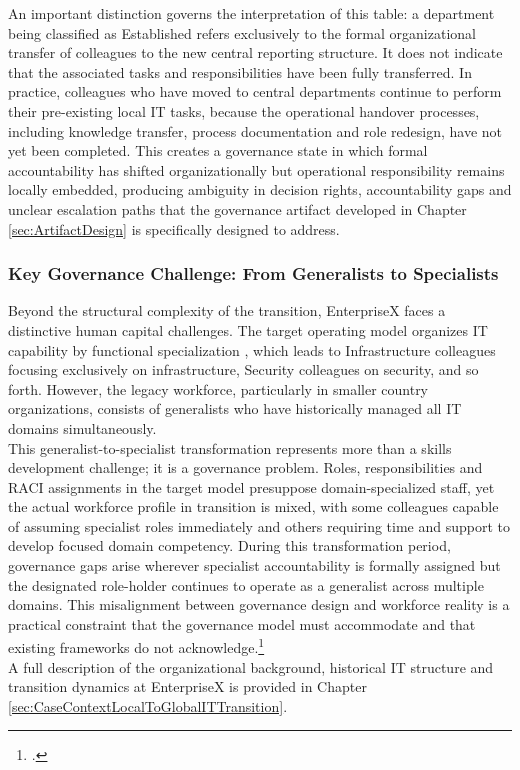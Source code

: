 An important distinction governs the interpretation of this table: a department being classified as \glqq{}Established\grqq{} refers exclusively to the formal organizational transfer of colleagues to the new central reporting structure.
It does not indicate that the associated tasks and responsibilities have been fully transferred.
In practice, colleagues who have moved to central departments continue to perform their pre-existing local IT tasks, because the operational handover processes, including knowledge transfer, process documentation and role redesign, have not yet been completed.
This creates a governance state in which formal accountability has shifted organizationally but operational responsibility remains locally embedded, producing ambiguity in decision rights, accountability gaps and unclear escalation paths that the governance artifact developed in Chapter \ref{sec:ArtifactDesign} is specifically designed to address.

\subsubsection{Key Governance Challenge: From Generalists to Specialists}
\label{subsubsec:GeneralistToSpecialistChallenge}
Beyond the structural complexity of the transition, EnterpriseX faces a distinctive human capital challenges.
The target operating model organizes IT capability by functional specialization , which leads to Infrastructure colleagues focusing exclusively on infrastructure, Security colleagues on security, and so forth.
However, the legacy workforce, particularly in smaller country organizations, consists of generalists who have historically managed all IT domains simultaneously.
\\
This generalist-to-specialist transformation represents more than a skills development challenge; it is a governance problem.
Roles, responsibilities and \ac{RACI} assignments in the target model presuppose domain-specialized staff, yet the actual workforce profile in transition is mixed, with some colleagues capable of assuming specialist roles immediately and others requiring time and support to develop focused domain competency.
During this transformation period, governance gaps arise wherever specialist accountability is formally assigned but the designated role-holder continues to operate as a generalist across multiple domains.
This misalignment between governance design and workforce reality is a practical constraint that the governance model must accommodate and that existing frameworks do not acknowledge.\footcite[26-27]{klotzCausingFactorsOutcomes2019}
\\
A full description of the organizational background, historical IT structure and transition dynamics at EnterpriseX is provided in Chapter \ref{sec:CaseContextLocalToGlobalITTransition}.

